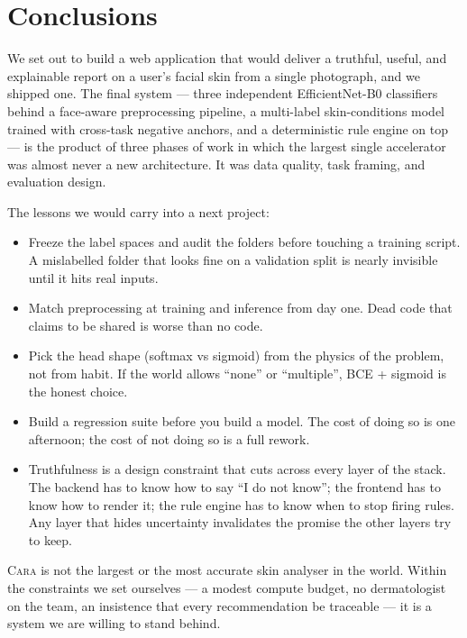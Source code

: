 \documentclass[11pt,a4paper,oneside]{report}
\newcommand{\cara}{\textsc{Cara}\xspace}
\newcommand{\effnet}{EfficientNet-B0\xspace}
\begin{document}
\chapter{Conclusions}\label{ch:conclusions}

We set out to build a web application that would deliver a
truthful, useful, and explainable report on a user's facial skin
from a single photograph, and we shipped one. The final system
--- three independent \effnet classifiers behind a face-aware
preprocessing pipeline, a multi-label skin-conditions model
trained with cross-task negative anchors, and a deterministic
rule engine on top --- is the product of three phases of work in
which the largest single accelerator was almost never a new
architecture. It was data quality, task framing, and evaluation
design.

The lessons we would carry into a next project:

\begin{itemize}
    \item Freeze the label spaces and audit the folders before
        touching a training script. A mislabelled folder that
        looks fine on a validation split is nearly invisible
        until it hits real inputs.
    \item Match preprocessing at training and inference from day
        one. Dead code that claims to be shared is worse than no
        code.
    \item Pick the head shape (softmax vs sigmoid) from the
        physics of the problem, not from habit. If the world
        allows ``none'' or ``multiple'', BCE + sigmoid is the
        honest choice.
    \item Build a regression suite before you build a model. The
        cost of doing so is one afternoon; the cost of not doing
        so is a full rework.
    \item Truthfulness is a design constraint that cuts across
        every layer of the stack. The backend has to know how to
        say ``I do not know''; the frontend has to know how to
        render it; the rule engine has to know when to stop
        firing rules. Any layer that hides uncertainty
        invalidates the promise the other layers try to keep.
\end{itemize}

\cara is not the largest or the most accurate skin analyser in the
world. Within the constraints we set ourselves --- a modest compute
budget, no dermatologist on the team, an insistence that every
recommendation be traceable --- it is a system we are willing to
stand behind.
\end{document}
